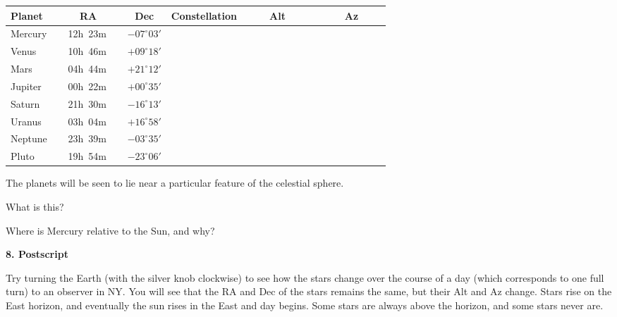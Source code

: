 \medskip
\begin{center}
\begin{tabular}{lccccc} \hline
Planet  & \ \ \ \ RA  \ \ \ & \hspace{1.5cm} Dec \hspace{1.5cm} &
         Constellation &\ \ \ \  Alt \ \ \ \ & \ \ \ \  Az\ \ \  \ \\ 
         \hline
Mercury   & 12h~23m & $-07^\circ 03'$  & & &       \\ \hline
Venus   & 10h~46m & $+09^\circ 18'$  &     & &    \\ \hline
Mars & 04h~44m & $+21^\circ 12'$  &     & &    \\ \hline
Jupiter  & 00h~22m & $+00^\circ 35'$  &   & &      \\ \hline
Saturn  & 21h~30m & $-16^\circ 13'$  &   & &      \\  \hline
Uranus & 03h~04m & $+16^\circ 58'$  &    & &   \\  \hline 
Neptune  & 23h~39m & $-03^\circ 35'$  &   & &    \\  \hline 
Pluto  & 19h~54m &  $-23^\circ 06'$ &   & &    \\  \hline 
\end{tabular}
\end{center}

\noindent The planets will be seen to lie near a particular feature of the
celestial sphere. 

\noindent What is this? \makebox[4cm]{\hrulefill}

\noindent Where is Mercury relative to the Sun, and why?

\bigskip
\bigskip
\bigskip

\noindent 
{\bf 8. Postscript}

\bigskip\noindent
Try turning the Earth (with the silver knob clockwise) to see how the
stars change over the course of a day (which corresponds to one full
turn) to an observer in NY.  You will see that the RA and Dec of the
stars remains the same, but their Alt and Az change. Stars rise on the
East horizon, and eventually the sun rises in the East and day
begins. Some stars are always above the horizon, and some stars never
are.


